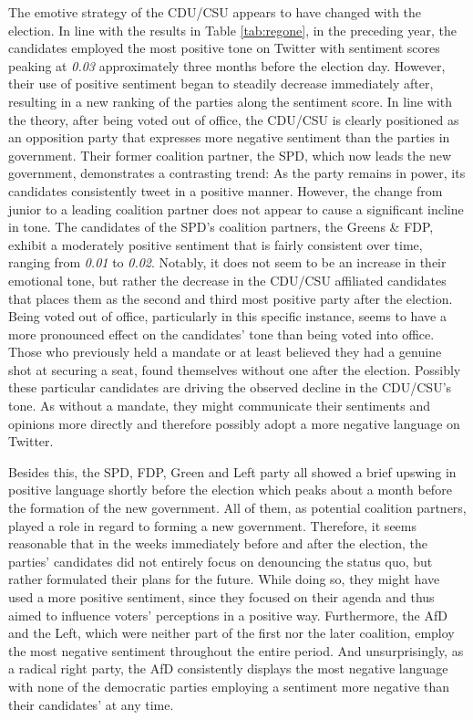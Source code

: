 \documentclass[a4paper,11pt]{article}
\begin{document}
The emotive strategy of the CDU/CSU appears to have changed with the election. In line with the results in Table \ref{tab:regone}, in the preceding year, the candidates employed the most positive tone on Twitter with sentiment scores peaking at \emph{0.03} approximately three months before the election day. However, their use of positive sentiment began to steadily decrease immediately after, resulting in a new ranking of the parties along the sentiment score. In line with the theory, after being voted out of office, the CDU/CSU is clearly positioned as an opposition party that expresses more negative sentiment than the parties in government. Their former coalition partner, the SPD, which now leads the new government, demonstrates a contrasting trend: As the party remains in power, its candidates consistently tweet in a positive manner. However, the change from junior to a leading coalition partner does not appear to cause a significant incline in tone. The candidates of the SPD's coalition partners, the Greens \& FDP, exhibit a moderately positive sentiment that is fairly consistent over time, ranging from \emph{0.01} to \emph{0.02}. Notably, it does not seem to be an increase in their emotional tone, but rather the decrease in the CDU/CSU affiliated candidates that places them as the second and third most positive party after the election. Being voted out of office, particularly in this specific instance, seems to have a more pronounced effect on the candidates' tone than being voted into office. Those who previously held a mandate or at least believed they had a genuine shot at securing a seat, found themselves without one after the election. Possibly these particular candidates are driving the observed decline in the CDU/CSU's tone. As without a mandate, they might communicate their sentiments and opinions more directly and therefore possibly adopt a more negative language on Twitter.

Besides this, the SPD, FDP, Green and Left party all showed a brief upswing in positive language shortly before the election which peaks about a month before the formation of the new government. All of them, as potential coalition partners, played a role in regard to forming a new government. Therefore, it seems reasonable that in the weeks immediately before and after the election, the parties' candidates did not entirely focus on denouncing the status quo, but rather formulated their plans for the future. While doing so, they might have used a more positive sentiment, since they focused on their agenda and thus aimed to influence voters' perceptions in a positive way. Furthermore, the AfD and the Left, which were neither part of the first nor the later coalition, employ the most negative sentiment throughout the entire period. And unsurprisingly, as a radical right party, the AfD consistently displays the most negative language with none of the democratic parties employing a sentiment more negative than their candidates' at any time.
\end{document}
